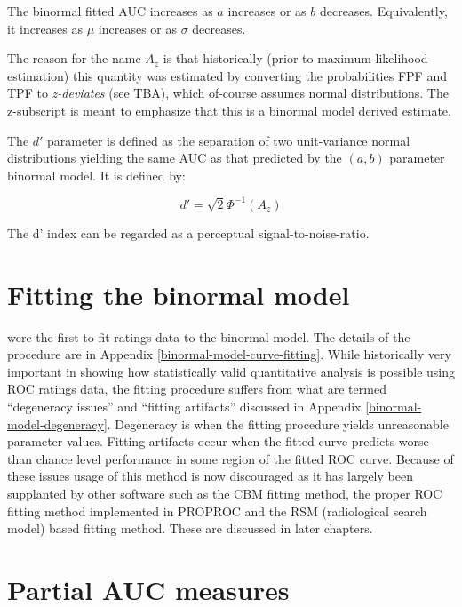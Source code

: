 \documentclass[
]{book}
\begin{document}
The binormal fitted AUC increases as \(a\) increases or as \(b\) decreases. Equivalently, it increases as \(\mu\) increases or as \(\sigma\) decreases.

The reason for the name \(A_z\) is that historically (prior to maximum likelihood estimation) this quantity was estimated by converting the probabilities FPF and TPF to \emph{z-deviates} (see TBA), which of-course assumes normal distributions. The z-subscript is meant to emphasize that this is a binormal model derived estimate.

The \(d'\) parameter is defined as the separation of two unit-variance normal distributions yielding the same AUC as that predicted by the \((a,b)\) parameter binormal model. It is defined by:

\begin{equation} 
d'=\sqrt{2}\Phi^{-1}\left ( A_z \right )
\label{eq:binormal-model-ab-2dprime}
\end{equation}

The d' index can be regarded as a perceptual signal-to-noise-ratio.

\hypertarget{binormal-model-fitting}{%
\section{Fitting the binormal model}\label{binormal-model-fitting}}

\citep{dorfman1969maximum} were the first to fit ratings data to the binormal model. The details of the procedure are in Appendix \ref{binormal-model-curve-fitting}. While historically very important in showing how statistically valid quantitative analysis is possible using ROC ratings data, the fitting procedure suffers from what are termed ``degeneracy issues'' and ``fitting artifacts'' discussed in Appendix \ref{binormal-model-degeneracy}. Degeneracy is when the fitting procedure yields unreasonable parameter values. Fitting artifacts occur when the fitted curve predicts worse than chance level performance in some region of the fitted ROC curve. Because of these issues usage of this method is now discouraged as it has largely been supplanted by other software such as the CBM fitting method, the proper ROC fitting method implemented in PROPROC and the RSM (radiological search model) based fitting method. These are discussed in later chapters.

\hypertarget{binormal-model-partial-auc}{%
\section{Partial AUC measures}\label{binormal-model-partial-auc}}
\end{document}
